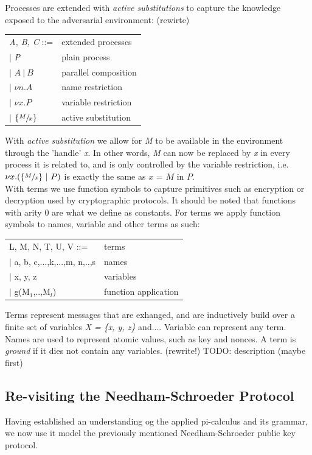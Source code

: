 Processes are extended with \textit{active substitutions} to capture the knowledge exposed to the
adversarial environment: (rewirte)
\begin{center}
	\begin{tabular} { l l }
 		\textit{A, B, C} ::= & extended processes \\ 
 		\quad $|$ \textit{P} & plain process \\  
 		\quad $|$ $A\ |\ B$ & parallel composition \\
		\quad $|$ $\nu n.A$ & name restriction \\
		\quad $|$ $\nu x.P$ & variable restriction \\
		\quad $|$ $\{ \sfrac{M}{x} \}$ & active substitution
	\end{tabular}
\end{center}
With \textit{active substitution} we allow for \textit{M} to be available in the environment through the 'handle' \textit{x}. In other words, \textit{M} can now be replaced by \textit{x} in every process it is related to, and is only controlled by the variable restriction, i.e. $\nu x.(\{\sfrac{M}{x}\}\ |\ P)$ is exactly the same as $x$ = $M$ in $P.$\\ 

With terms we use function symbols to capture primitives such as encryption or decryption used by cryptographic protocols. It should be noted that functions with arity 0 are what we define as constants.
For terms we apply function symbols to names, variable and other terms as such: 
\begin{center}
	\begin{tabular} { l l }
 		L, M, N, T, U, V ::= & terms \\ 
 		\quad $|$ a, b, c,...,k,...,m, n,..,s & names \\  
 		\quad $|$ x, y, z & variables \\
 		\quad $|$ g(M$_{1}$,..,M$_{l}$) & function application
	\end{tabular}
\end{center}
Terms represent messages that are exhanged, and are inductively build over a finite set of variables \textit{X = \{x, y, z\}} and.... Variable can represent any term. Names are used to represent atomic values, such as key and nonces. A term is \textit{ground} if it dies not contain any variables. (rewrite!)
TODO: description (maybe first)

\subsection{Re-visiting the Needham-Schroeder Protocol}
Having established an understanding og the applied pi-calculus and its grammar, we now use it model the previously mentioned Needham-Schroeder public key protocol.\\

